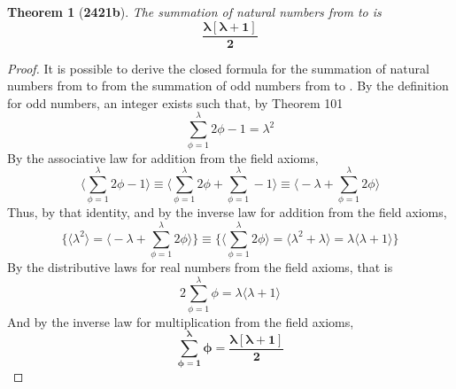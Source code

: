 \documentclass[preview]{standalone}
\newtheorem{theorem}{Theorem}
\begin{document}
\begin{theorem}[\textbf{2421b}]
    The summation of natural numbers from  to \bm{$\lambda$} 
    is 
    \begin{equation*}
        \bm{
            \frac{ \lambda [ \lambda + 1 ]}{2}
        }
    \end{equation*}
\end{theorem}

\begin{proof}
    It is possible to derive the closed formula for the summation of natural numbers
    from  to \bm{$\lambda$} 
    from the summation of odd numbers from  to \bm{$\lambda$}.
    By the definition for odd numbers, 
    an integer \bm{$\phi$} exists such that,
    by Theorem 101
    \begin{equation*}
        \sum_{\phi=1}^\lambda 2 \phi - 1 
            = 
        \lambda ^2
    \end{equation*}
    By the associative law for addition from the field axioms,
    \begin{equation*}
        \bigg \langle \sum_{\phi=1}^\lambda 2 \phi - 1 \bigg \rangle
            \equiv
        \bigg \langle 
            \sum_{\phi=1}^\lambda 2 \phi 
                +
            \sum_{\phi=1}^\lambda - 1
        \bigg \rangle
            \equiv
        \bigg \langle 
            -\lambda 
                +
            \sum_{\phi=1}^\lambda 2 \phi 
        \bigg \rangle
    \end{equation*}
    Thus, by that identity, and by the inverse law for addition from the field axioms,
    \begin{equation*}
        \Bigg\{
            \bigg \langle \lambda ^2 \bigg \rangle
                = 
            \bigg \langle 
                -\lambda 
                    + 
                \sum_{\phi=1}^\lambda 2 \phi 
            \bigg \rangle
        \Bigg\}
            \equiv 
        \Bigg\{
            \bigg \langle \sum_{\phi=1}^\lambda 2 \phi \bigg \rangle 
                = 
            \bigg \langle \lambda ^2 + \lambda \bigg \rangle 
                = 
            \lambda \bigg \langle \lambda + 1 \bigg \rangle
        \Bigg\}
    \end{equation*}
    By the distributive laws for real numbers from the field axioms, that is
    \begin{equation*}
        2 \sum_{\phi=1}^\lambda \phi 
            = 
        \lambda \Big \langle \lambda + 1 \Big \rangle
    \end{equation*} 
    And by the inverse law for multiplication from the field axioms,
    \begin{equation*}
        \bm{
            \sum_{\phi=1}^\lambda \phi 
                = 
            \frac{ \lambda [ \lambda + 1 ] }{2}
        }
    \end{equation*}
\end{proof}
\end{document}
